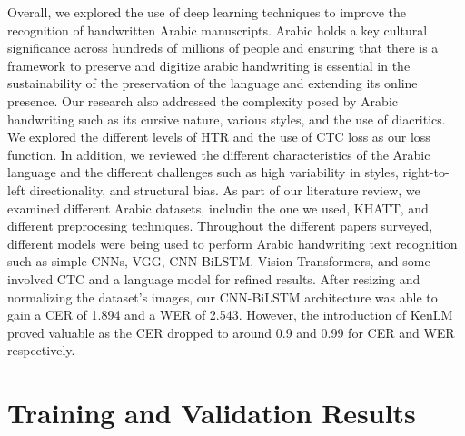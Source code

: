 \documentclass[conference]{IEEEtran}
\begin{document}
Overall, we explored the use of deep learning techniques to improve the recognition of handwritten Arabic manuscripts. Arabic holds a key cultural significance across hundreds of millions of people and ensuring that there is a framework to preserve and digitize arabic handwriting is essential in the sustainability of the preservation of the language and extending its online presence. Our research also addressed the complexity posed by Arabic handwriting such as its cursive nature, various styles, and the use of diacritics. We explored the different levels of HTR and the use of CTC loss as our loss function. In addition, we reviewed the different characteristics of the Arabic language and the different challenges such as high variability in styles, right-to-left directionality, and structural bias. As part of our literature review, we examined different Arabic datasets, includin the one we used, KHATT, and different preprocesing techniques. Throughout the different papers surveyed, different models were being used to perform Arabic handwriting text recognition such as simple CNNs, VGG, CNN-BiLSTM, Vision Transformers, and some involved CTC and a language model for refined results. After resizing and normalizing the dataset's images, our CNN-BiLSTM architecture was able to gain a CER of 1.894 and a WER of 2.543. However, the introduction of KenLM proved valuable as the CER dropped to around 0.9 and 0.99 for CER and WER respectively. 





 



\newpage 
\clearpage

\appendices

\onecolumn

\section{Training and Validation Results}
\label{TrainValidateResults}
\end{document}
